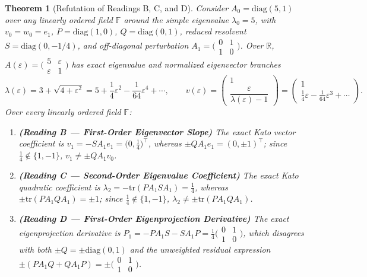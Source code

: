 \documentclass[11pt,a4paper]{article}
\newtheorem{theorem}{Theorem}[section]
\theoremstyle{definition}
\newcommand{\tr}{\mathrm{tr}}
\newcommand{\diag}{\mathrm{diag}}
\begin{document}
\begin{theorem}[Refutation of Readings B, C, and D]\label{thm:readingBCD}
Consider $A_0 = \diag(5, 1)$ over any linearly ordered field $\mathbb{F}$ around the
simple eigenvalue $\lambda_0 = 5$, with $v_0 = w_0 = e_1$, $P = \diag(1, 0)$,
$Q = \diag(0, 1)$, reduced resolvent $S = \diag(0, -1/4)$, and off-diagonal perturbation
$A_1 = \bigl(\begin{smallmatrix} 0 & 1 \\ 1 & 0 \end{smallmatrix}\bigr)$. Over
$\mathbb{R}$, $A(\varepsilon) = \bigl(\begin{smallmatrix} 5 & \varepsilon \\ \varepsilon & 1
\end{smallmatrix}\bigr)$ has exact eigenvalue and normalized eigenvector branches
\[
  \lambda(\varepsilon) = 3 + \sqrt{4 + \varepsilon^2}
  = 5 + \frac{1}{4}\varepsilon^2 - \frac{1}{64}\varepsilon^4 + \cdots,
  \qquad
  v(\varepsilon) = \begin{pmatrix} 1 \\ \dfrac{\varepsilon}{\lambda(\varepsilon) - 1} \end{pmatrix}
  = \begin{pmatrix} 1 \\ \frac{1}{4}\varepsilon - \frac{1}{64}\varepsilon^3 + \cdots \end{pmatrix}.
\]
Over every linearly ordered field $\mathbb{F}$:
\begin{enumerate}
  \item \textbf{(Reading B --- First-Order Eigenvector Slope)} The exact Kato vector
  coefficient is $v_1 = - S A_1 e_1 = \bigl(0, \frac{1}{4}\bigr)^\top$, whereas
  $\pm Q A_1 e_1 = (0, \pm 1)^\top$; since $\frac{1}{4} \notin \{1, -1\}$,
  $v_1 \neq \pm Q A_1 v_0$.
  \item \textbf{(Reading C --- Second-Order Eigenvalue Coefficient)} The exact Kato
  quadratic coefficient is $\lambda_2 = -\tr(P A_1 S A_1) = \frac{1}{4}$, whereas
  $\pm\tr(P A_1 Q A_1) = \pm 1$; since $\frac{1}{4} \notin \{1, -1\}$,
  $\lambda_2 \neq \pm\tr(P A_1 Q A_1)$.
  \item \textbf{(Reading D --- First-Order Eigenprojection Derivative)} The exact
  eigenprojection derivative is $P_1 = - P A_1 S - S A_1 P =
  \frac{1}{4}\bigl(\begin{smallmatrix} 0 & 1 \\ 1 & 0 \end{smallmatrix}\bigr)$, which
  disagrees with both $\pm Q = \pm\diag(0, 1)$ and the unweighted residual expression
  $\pm(P A_1 Q + Q A_1 P) = \pm\bigl(\begin{smallmatrix} 0 & 1 \\ 1 & 0 \end{smallmatrix}\bigr)$.
\end{enumerate}
\end{theorem}
\end{document}
